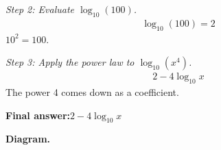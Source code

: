\documentclass[11pt]{article}
\begin{document}
\textit{Step 2: Evaluate \( \log_{10}(100) \).}
\[\begin{gathered}
\log_{10}(100) = 2
\end{gathered}\]
\( 10^2 = 100 \).

\textit{Step 3: Apply the power law to \( \log_{10}(x^4) \).}
\[\begin{gathered}
2 - 4\log_{10} x
\end{gathered}\]
The power 4 comes down as a coefficient.

\begin{answerbox}
\textbf{Final answer:}\quad \(\displaystyle  2 - 4\log_{10} x \)
\end{answerbox}
\textbf{Diagram.}

\begin{center}
\end{center}
\end{document}
